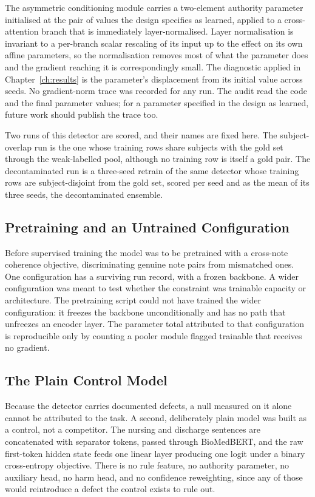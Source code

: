 The asymmetric conditioning module carries a two-element authority parameter initialised at the pair
of values the design specifies as learned, applied to a cross-attention branch that is immediately
layer-normalised. Layer normalisation is invariant to a per-branch scalar rescaling of its input up
to the effect on its own affine parameters, so the normalisation removes most of what the parameter
does and the gradient reaching it is correspondingly small. The diagnostic applied in
Chapter~\ref{ch:results} is the parameter's displacement from its initial value across seeds. No
gradient-norm trace was recorded for any run. The audit read the code and the final parameter
values; for a parameter specified in the design as learned, future work should publish the trace too.

Two runs of this detector are scored, and their names are fixed here. The subject-overlap run is the
one whose training rows share subjects with the gold set through the weak-labelled pool,
although no training row is itself a gold pair. The decontaminated run is a three-seed retrain of the
same detector whose training rows are subject-disjoint from the gold set, scored per seed and as the
mean of its three seeds, the decontaminated ensemble.

\subsection{Pretraining and an Untrained Configuration}

Before supervised training the model was to be pretrained with a cross-note coherence objective,
discriminating genuine note pairs from mismatched ones. One configuration has a surviving run
record, with a frozen backbone. A wider configuration was meant to test whether the constraint was trainable capacity or
architecture. The pretraining script could not have trained the wider
configuration: it freezes the backbone unconditionally and has no path that unfreezes an encoder
layer. The parameter total attributed to that configuration is reproducible only by counting a
pooler module flagged trainable that receives no gradient.

\subsection{The Plain Control Model}
\label{sec:m-control-model}

Because the detector carries documented defects, a null measured on it alone cannot be attributed
to the task. A second, deliberately plain model was built as a control, not a competitor. The nursing and discharge sentences are concatenated with separator tokens, passed through
BioMedBERT, and the raw first-token hidden state feeds one linear layer producing one logit under a
binary cross-entropy objective. There is no rule feature, no authority parameter, no auxiliary
head, no harm head, and no confidence reweighting, since any of those would reintroduce a defect the
control exists to rule out.

